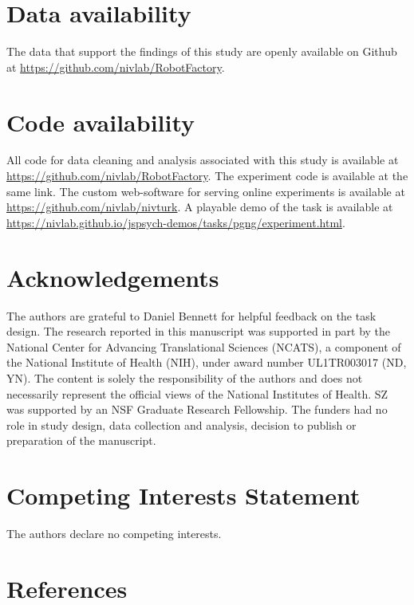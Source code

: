 \documentclass[a4paper,12pt]{article}
\begin{document}
\begin{refsection}[main]
\break
\section*{Data availability}

The data that support the findings of this study are openly available on Github at \url{https://github.com/nivlab/RobotFactory}.

\section*{Code availability}

All code for data cleaning and analysis associated with this study is available at \url{https://github.com/nivlab/RobotFactory}. The experiment code is available at the same link.  The custom web-software for serving online experiments is available at \url{https://github.com/nivlab/nivturk}. A playable demo of the task is available at \url{https://nivlab.github.io/jspsych-demos/tasks/pgng/experiment.html}.

\section*{Acknowledgements}

The authors are grateful to Daniel Bennett for helpful feedback on the task design. The research reported in this manuscript was supported in part by the National Center for Advancing Translational Sciences (NCATS), a component of the National Institute of Health (NIH), under award number UL1TR003017 (ND, YN). The content is solely the responsibility of the authors and does not necessarily represent the official views of the National Institutes of Health. SZ was supported by an NSF Graduate Research Fellowship. The funders had no role in study design, data collection and analysis, decision to publish or preparation of the manuscript.

\section*{Competing Interests Statement}

The authors declare no competing interests.

\break
\section*{References}
\printbibliography[heading=main]
\end{refsection}
\end{document}
